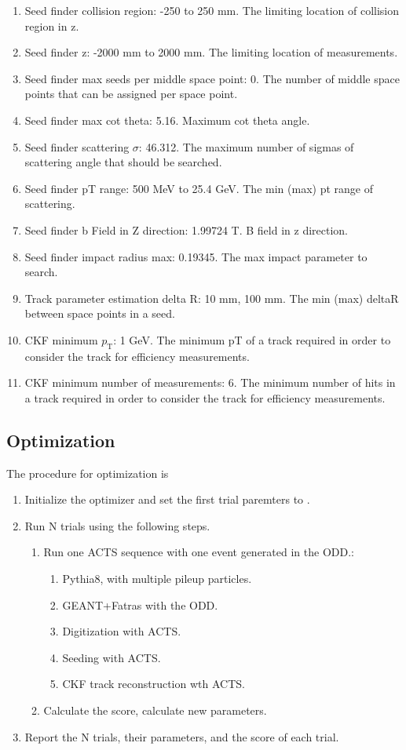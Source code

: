 \documentclass{article}
\newcommand{\pt}[0]{p_\textrm{T}}
\begin{document}
\begin{enumerate}
\item Seed finder collision region: -250 to 250 mm. The limiting location of collision region in z.
\item Seed finder z: -2000 mm to 2000 mm. The limiting location of measurements.
\item Seed finder max seeds per middle space point: 0. The number of middle space points that can be assigned per space point.
\item Seed finder max cot theta: 5.16. Maximum cot theta angle.
\item Seed finder scattering $\sigma$: 46.312. The maximum number of sigmas of scattering angle that should be searched.
\item Seed finder pT range: 500 MeV to 25.4 GeV. The min (max) pt range of scattering.
\item Seed finder b Field in Z direction: 1.99724 T. B field in z direction.
\item Seed finder impact radius max: 0.19345. The max impact parameter to search.
\item Track parameter estimation delta R: 10 mm, 100 mm. The min (max) deltaR between space points in a seed.
\item CKF minimum $\pt$: 1 GeV. The minimum pT of a track required in order to consider the track for efficiency measurements.
\item CKF minimum number of measurements: 6. The minimum number of hits in a track required in order to consider the track for efficiency measurements.
\end{enumerate}
\subsection{\label{b87dfa0}Optimization}
The procedure for optimization is
\begin{enumerate}
\item Initialize the optimizer and set the first trial paremters to .
\item Run N trials using the following steps.
\begin{enumerate}
\item Run one ACTS sequence with one event generated in the ODD.:
\begin{enumerate}
\item Pythia8, with multiple pileup particles.
\item GEANT+Fatras with the ODD.
\item Digitization with ACTS.
\item Seeding with ACTS.
\item CKF track reconstruction wth ACTS.
\end{enumerate}
\item Calculate the score, calculate new parameters.
\end{enumerate}
\item Report the N trials, their parameters, and the score of each trial.
\end{enumerate}
\end{document}
